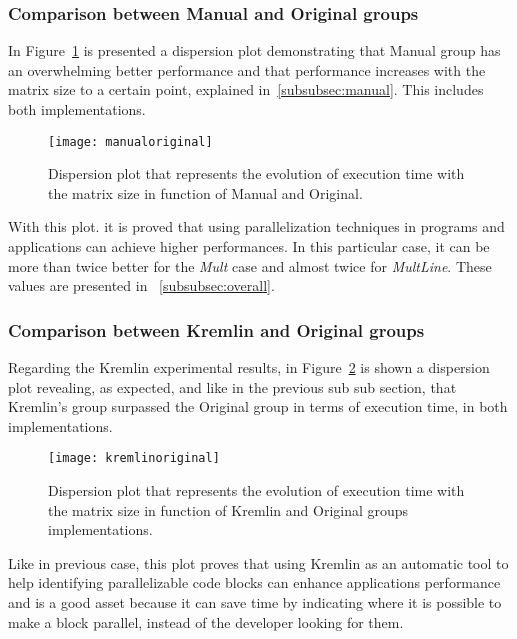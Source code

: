 \subsubsection{Comparison between Manual and Original groups}

In Figure~\ref{fig:manualoriginal} is presented a dispersion plot 
demonstrating that Manual group has an overwhelming better performance and that performance increases with the matrix size to a certain point, explained in~\ref{subsubsec:manual}. This includes both implementations.
\begin{figure}[htb]
	\begin{center}
		\leavevmode
		\texttt{[image: manualoriginal]}
		\caption{Dispersion plot that represents the evolution of execution time with the matrix size in function of Manual and Original.}
		\label{fig:manualoriginal}
	\end{center}
\end{figure}

With this plot. it is proved that using parallelization techniques in programs and applications can achieve higher performances. In this particular case, it can be more than twice better for the \textit{Mult} case and almost twice for \textit{MultLine}. These values are presented in ~\ref{subsubsec:overall}.

\subsubsection{Comparison between Kremlin and Original groups}

Regarding the Kremlin experimental results, in Figure~\ref{fig:kremlinoriginal} is shown a dispersion plot revealing, as expected, and like in the previous sub sub section, that Kremlin's group surpassed the Original group in terms of execution time, in both implementations.

\begin{figure}[htb]
	\begin{center}
		\leavevmode
		\texttt{[image: kremlinoriginal]}
		\caption{Dispersion plot that represents the evolution of execution time with the matrix size in function of  Kremlin and Original groups implementations.}
		\label{fig:kremlinoriginal}
	\end{center}
\end{figure}

Like in previous case, this plot proves that using Kremlin as an automatic tool to help identifying parallelizable code blocks can enhance applications performance and is a good asset because it can save time by indicating where it is possible to make a block parallel, instead of the developer looking for them.

